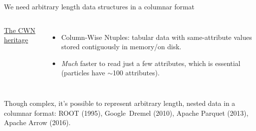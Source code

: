 \documentclass[aspectratio=169]{beamer}
\begin{document}
\begin{frame}{We need arbitrary length data structures in a columnar format}
\begin{columns}[t]
\underline{\large The CWN heritage}

\vspace{0.25 cm}
\begin{itemize}
\item Column-Wise Ntuples: tabular data with same-attribute values stored contiguously in memory/on disk.
\item {\it Much} faster to read just a few attributes, which is essential (particles have $\sim$100 attributes).
\end{itemize}

\end{columns}

\begin{columns}

\begin{center}
Though complex, it's possible to represent arbitrary length, nested data in a columnar format: ROOT (1995), Google~Dremel (2010), Apache Parquet (2013), Apache Arrow (2016).
\end{center}
\end{columns}
\end{frame}
\end{document}
